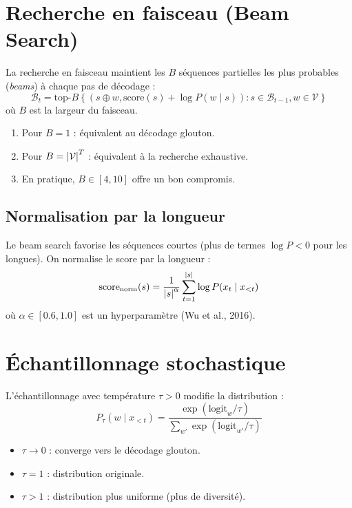 \section{Recherche en faisceau (Beam Search)}
\label{sec:gen:beam}

\begin{definition}
La recherche en faisceau maintient les $B$ s\'equences partielles les plus
probables (\emph{beams}) \`a chaque pas de d\'ecodage :
\[
\mathcal{B}_t = \text{top-}B\left\{(s \oplus w, \text{score}(s) + \log P(w \mid s)) : s \in \mathcal{B}_{t-1}, w \in \mathcal{V}\right\}
\]
o\`u $B$ est la largeur du faisceau.
\end{definition}

\begin{proposition}
\begin{enumerate}
    \item Pour $B = 1$ : \'equivalent au d\'ecodage glouton.
    \item Pour $B = \left| \mathcal{V} \right|^T$ : \'equivalent \`a la recherche exhaustive.
    \item En pratique, $B \in [4, 10]$ offre un bon compromis.
\end{enumerate}
\end{proposition}

\subsection{Normalisation par la longueur}

Le beam search favorise les s\'equences courtes (plus de termes $\log P < 0$
pour les longues). On normalise le score par la longueur :
\[
\text{score}_{\text{norm}}(s) = \frac{1}{\left| s \right|^\alpha} \sum_{t=1}^{\left| s \right|} \log P(x_t \mid x_{<t})
\]
o\`u $\alpha \in [0.6, 1.0]$ est un hyperparam\`etre (Wu et al., 2016).

\section{\'Echantillonnage stochastique}
\label{sec:gen:sampling}

\begin{definition}
L'\'echantillonnage avec temp\'erature $\tau > 0$ modifie la distribution :
\[
P_\tau(w \mid x_{<t}) = \frac{\exp(\text{logit}_w / \tau)}{\sum_{w'} \exp(\text{logit}_{w'} / \tau)}
\]
\begin{itemize}
    \item $\tau \to 0$ : converge vers le d\'ecodage glouton.
    \item $\tau = 1$ : distribution originale.
    \item $\tau > 1$ : distribution plus uniforme (plus de diversit\'e).
\end{itemize}
\end{definition}

